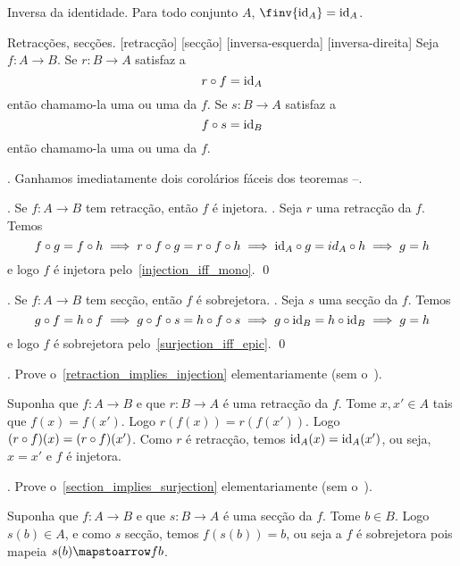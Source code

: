 \corollary Inversa da identidade.
Para todo conjunto $A$, $\finv {\id_A} = \id_A$.

 Retracções, secções.
\label{retractions_sections}%
\label{retraction}%
[retracção]%
[secção]%
[inversa-esquerda]%
[inversa-direita]%
Seja $f : A \to B$.
Se $r : B \to A$ satisfaz a
$$
r \of f = \id_A
$$
então chamamo-la uma  ou uma
 da $f$.
Se $s : B \to A$ satisfaz a
$$
f \of s = \id_B
$$
então chamamo-la uma  ou uma
 da $f$.

\blah.
Ganhamos imediatamente dois corolários fáceis dos teoremas
--.

\corollary.
\label{retraction_implies_injection}%
Se $f : A \to B$ tem retracção, então $f$ é injetora.
\proof.
Seja $r$ uma retracção da $f$.
Temos
$$
f \of g = f \of h
\implies r \of f \of g = r \of f \of h
\implies \id_A \of g = id_A \of h
\implies g = h
$$
e logo $f$ é injetora pelo~\ref{injection_iff_mono}.
\qed

\corollary.
\label{section_implies_surjection}%
Se $f : A \to B$ tem secção, então $f$ é sobrejetora.
\proof.
Seja $s$ uma secção da $f$.
Temos
$$
g \of f = h \of f
\implies g \of f \of s = h \of f \of s
\implies g \of \id_B = h \of \id_B
\implies g = h
$$
e logo $f$ é sobrejetora pelo~\ref{surjection_iff_epic}.
\qed

\exercise.
\label{retraction_implies_injection_elementary_proof}%
Prove o~\ref{retraction_implies_injection} elementariamente (sem o~).

\solution
Suponha que $f : A \to B$ e que $r : B \to A$ é uma retracção da $f$.
Tome $x, x' \in A$ tais que $f(x) = f(x')$.
Logo $r(f(x)) = r(f(x'))$.
Logo $(r\of f)(x) = (r\of f)(x')$.
Como $r$ é retracção, temos $\hbox{\rm id}_A(x) = \hbox{\rm id}_A(x')$, ou seja, $x = x'$ e $f$ é injetora.

\endexercise

\exercise.
\label{section_implies_surjection_elementary_proof}%
Prove o~\ref{section_implies_surjection} elementariamente (sem o~).

\solution
Suponha que $f : A \to B$ e que $s : B \to A$ é uma secção da $f$.
Tome $b \in B$.
Logo $s(b) \in A$, e como $s$ secção, temos $f(s(b)) = b$, ou seja
a $f$ é sobrejetora pois mapeia $s(b) \mapstoarrow f b$.

